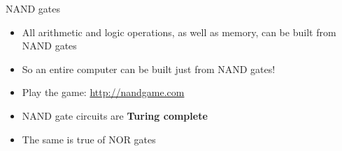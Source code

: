 \begin{frame}{NAND gates}
    \begin{itemize}
        \pause\item All arithmetic and logic operations, as well as memory, can be built from NAND gates
        \pause\item So an entire computer can be built just from NAND gates!
        \pause\item Play the game: \url{http://nandgame.com}
        \pause\item NAND gate circuits are \textbf{Turing complete}
        \pause\item The same is true of NOR gates
    \end{itemize}
\end{frame}

